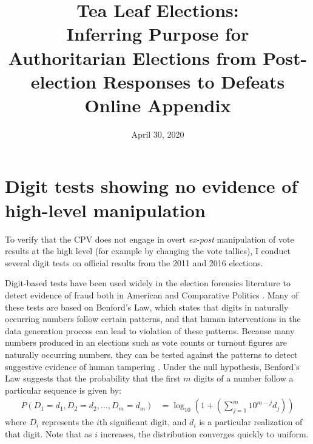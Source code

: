 \documentclass[12pt]{article}
\title{Tea Leaf Elections: \\
	Inferring Purpose for Authoritarian Elections from Post-election Responses to Defeats \\
	\vspace{2ex}
	Online Appendix}
\date{April 30, 2020}
\newcommand{\1}{\mathbbm{1}}
\renewcommand\r{\right}
\renewcommand\l{\left}
\begin{document}
	

\maketitle
\thispagestyle{empty}


\doublespacing

\newpage
{}

\tableofcontents
\newpage

\appendix

\section{Digit tests showing no evidence of high-level manipulation}
\label{app:benford}
To verify that the CPV does not engage in overt \textit{ex-post} manipulation of vote results at the high level (for example by changing the vote tallies), I conduct several digit tests on official results from the 2011 and 2016 elections. 

Digit-based tests have been used widely in the election forensics literature to detect evidence of fraud both in American \citep{Mebane2006} and Comparative Politics \citep{Mebane2009, Beber2012}. Many of these tests are based on Benford's Law, which states that digits in naturally occurring numbers follow certain patterns, and that human interventions in the data generation process can lead to violation of these patterns. Because many numbers produced in an elections such as vote counts or turnout figures are naturally occurring numbers, they can be tested against the patterns to detect suggestive evidence of human tampering \citep{Mebane2006}. Under the null hypothesis, Benford's Law suggests that the probability that the first $m$ digits of a number follow a particular sequence is given by:
\begin{align*}
P(D_1=d_1, D_2=d_2, \dots, D_m=d_m) &= \log_{10}\l(1 + \l( \sum_{j=1}^{m}10^{m-j}d_j\r)\r)
\end{align*}
where $D_i$ represents the $i$th significant digit, and $d_i$ is a particular realization of that digit. 
Note that as $i$ increases, the distribution converges quickly to uniform.
\end{document}
